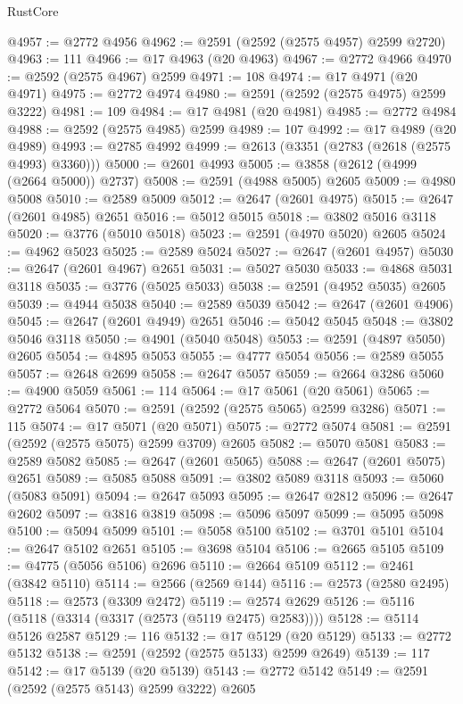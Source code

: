 \begin{lexlean}{RustCore}
\begin{coremodule}
@4957 := @2772 @4956
@4962 := @2591 (@2592 (@2575 @4957) @2599 @2720)
@4963 := 111
@4966 := @17 @4963 (@20 @4963)
@4967 := @2772 @4966
@4970 := @2592 (@2575 @4967) @2599
@4971 := 108
@4974 := @17 @4971 (@20 @4971)
@4975 := @2772 @4974
@4980 := @2591 (@2592 (@2575 @4975) @2599 @3222)
@4981 := 109
@4984 := @17 @4981 (@20 @4981)
@4985 := @2772 @4984
@4988 := @2592 (@2575 @4985) @2599
@4989 := 107
@4992 := @17 @4989 (@20 @4989)
@4993 := @2785 @4992
@4999 := @2613 (@3351 (@2783 (@2618 (@2575 @4993) @3360)))
@5000 := @2601 @4993
@5005 := @3858 (@2612 (@4999 (@2664 @5000)) @2737)
@5008 := @2591 (@4988 @5005) @2605
@5009 := @4980 @5008
@5010 := @2589 @5009
@5012 := @2647 (@2601 @4975)
@5015 := @2647 (@2601 @4985) @2651
@5016 := @5012 @5015
@5018 := @3802 @5016 @3118
@5020 := @3776 (@5010 @5018)
@5023 := @2591 (@4970 @5020) @2605
@5024 := @4962 @5023
@5025 := @2589 @5024
@5027 := @2647 (@2601 @4957)
@5030 := @2647 (@2601 @4967) @2651
@5031 := @5027 @5030
@5033 := @4868 @5031 @3118
@5035 := @3776 (@5025 @5033)
@5038 := @2591 (@4952 @5035) @2605
@5039 := @4944 @5038
@5040 := @2589 @5039
@5042 := @2647 (@2601 @4906)
@5045 := @2647 (@2601 @4949) @2651
@5046 := @5042 @5045
@5048 := @3802 @5046 @3118
@5050 := @4901 (@5040 @5048)
@5053 := @2591 (@4897 @5050) @2605
@5054 := @4895 @5053
@5055 := @4777 @5054
@5056 := @2589 @5055
@5057 := @2648 @2699
@5058 := @2647 @5057
@5059 := @2664 @3286
@5060 := @4900 @5059
@5061 := 114
@5064 := @17 @5061 (@20 @5061)
@5065 := @2772 @5064
@5070 := @2591 (@2592 (@2575 @5065) @2599 @3286)
@5071 := 115
@5074 := @17 @5071 (@20 @5071)
@5075 := @2772 @5074
@5081 := @2591 (@2592 (@2575 @5075) @2599 @3709) @2605
@5082 := @5070 @5081
@5083 := @2589 @5082
@5085 := @2647 (@2601 @5065)
@5088 := @2647 (@2601 @5075) @2651
@5089 := @5085 @5088
@5091 := @3802 @5089 @3118
@5093 := @5060 (@5083 @5091)
@5094 := @2647 @5093
@5095 := @2647 @2812
@5096 := @2647 @2602
@5097 := @3816 @3819
@5098 := @5096 @5097
@5099 := @5095 @5098
@5100 := @5094 @5099
@5101 := @5058 @5100
@5102 := @3701 @5101
@5104 := @2647 @5102 @2651
@5105 := @3698 @5104
@5106 := @2665 @5105
@5109 := @4775 (@5056 @5106) @2696
@5110 := @2664 @5109
@5112 := @2461 (@3842 @5110)
@5114 := @2566 (@2569 @144)
@5116 := @2573 (@2580 @2495)
@5118 := @2573 (@3309 @2472)
@5119 := @2574 @2629
@5126 := @5116 (@5118 (@3314 (@3317 (@2573 (@5119 @2475) @2583))))
@5128 := @5114 @5126 @2587
@5129 := 116
@5132 := @17 @5129 (@20 @5129)
@5133 := @2772 @5132
@5138 := @2591 (@2592 (@2575 @5133) @2599 @2649)
@5139 := 117
@5142 := @17 @5139 (@20 @5139)
@5143 := @2772 @5142
@5149 := @2591 (@2592 (@2575 @5143) @2599 @3222) @2605

\end{coremodule}
\end{lexlean}

